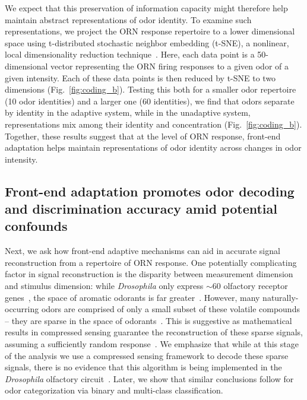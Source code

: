 We expect that this preservation of information capacity might therefore help maintain  abstract representations of odor identity. To examine such  representations, we project the ORN  response repertoire to a lower dimensional space using t-distributed stochastic neighbor embedding (t-SNE), a nonlinear, local dimensionality reduction technique~\cite{tsne}. Here, each data point is a 50-dimensional vector representing the ORN firing responses to a given odor of a given intensity. Each of these data points is then reduced by t-SNE to  two dimensions (Fig.~\ref{fig:coding_b}). %
Testing this both for a smaller odor repertoire (10 odor identities) and a larger one (60 identities), we find that odors  separate by identity in the adaptive system, while in the unadaptive system, representations  mix among their identity and concentration (Fig.~\ref{fig:coding_b}). Together, these results suggest that at the level of ORN response, front-end adaptation helps maintain representations of odor identity across changes in odor intensity.




\subsection{Front-end adaptation promotes odor decoding and discrimination accuracy amid potential confounds}

Next, we ask how front-end adaptive mechanisms can aid in accurate signal reconstruction from a repertoire of ORN response.  One potentially complicating factor in signal reconstruction is the disparity between measurement dimension and stimulus dimension: while \textit{Drosophila} only express $\sim 60$ olfactory receptor genes~\cite{olfactory_sensory_map}, the space of aromatic odorants is far greater~\cite{vijay_1}. However, many naturally-occurring odors are comprised of only a small subset of these volatile compounds -- they are sparse in the space of odorants~\cite{vijay_1}. This is suggestive as mathematical results in compressed sensing guarantee the reconstruction of these sparse signals, assuming a sufficiently random response~\cite{CS_donoho, CS_tao, CS_ganguli}. We emphasize that while at this stage of the analysis we use a compressed sensing framework to decode these sparse signals, there is no evidence that this algorithm is being implemented in the \textit{Drosophila} olfactory circuit~\cite{chlovskii_pevlavan}. Later, we show that similar conclusions follow for odor categorization via binary and multi-class classification.

